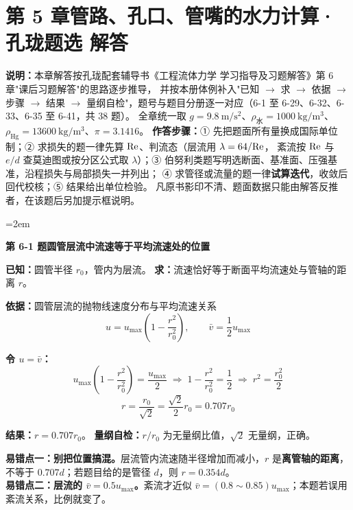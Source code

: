 \chapter*{第 5 章\quad 管路、孔口、管嘴的水力计算·孔珑题选 解答}

\begin{tishi}
\textbf{说明：}本章解答按孔珑配套辅导书《工程流体力学 学习指导及习题解答》第 6 章"课后习题解答"的思路逐步推导，
并按本册体例补入"已知 $\to$ 求 $\to$ 依据 $\to$ 步骤 $\to$ 结果 $\to$ 量纲自检"，题号与题目分册逐一对应（6-1 至 6-29、6-32、6-33、6-35 至 6-41，共 38 题）。
全章统一取 $g=9.8\ \mathrm{m/s^2}$、$\rho_{\text{水}}=1000\ \mathrm{kg/m^3}$、$\rho_{\text{Hg}}=13600\ \mathrm{kg/m^3}$、$\pi=3.1416$。
\textbf{作答步骤：}① 先把题面所有量换成国际单位制；② 求损失的题一律先算 $\mathrm{Re}$、判流态（层流用 $\lambda=64/\mathrm{Re}$，
紊流按 $\mathrm{Re}$ 与 $e/d$ 查莫迪图或按分区公式取 $\lambda$）；③ 伯努利类题写明选断面、基准面、压强基准，沿程损失与局部损失一并列出；
④ 求管径或流量的题一律\textbf{试算迭代}，收敛后回代校核；⑤ 结果给出单位检验。
凡原书影印不清、题面数据只能由解答反推者，在该题后另加提示框说明。
\end{tishi}

\sloppy
\emergencystretch=2em

\noindent\textbf{第 6-1 题\quad 圆管层流中流速等于平均流速处的位置}

\begin{jie}
\textbf{已知：}圆管半径 $r_0$，管内为层流。
\textbf{求：}流速恰好等于断面平均流速处与管轴的距离 $r$。

\textbf{依据：}圆管层流的抛物线速度分布与平均流速关系
\[ u=u_{\max}\left(1-\frac{r^2}{r_0^2}\right),\qquad \bar v=\frac{1}{2}u_{\max} \]

\textbf{令 $u=\bar v$：}
\[ u_{\max}\left(1-\frac{r^2}{r_0^2}\right)=\frac{u_{\max}}{2}\;\Longrightarrow\;1-\frac{r^2}{r_0^2}=\frac12
\;\Longrightarrow\;r^2=\frac{r_0^2}{2} \]
\[ r=\frac{r_0}{\sqrt2}=\frac{\sqrt2}{2}r_0=0.707r_0 \]

\textbf{结果：}$r=0.707r_0$。
\textbf{量纲自检：}$r/r_0$ 为无量纲比值，$\sqrt2$ 无量纲，正确。
\end{jie}

\begin{yicuo}
\textbf{易错点一：别把位置搞混。}层流管内流速随半径增加而减小，$r$ 是\textbf{离管轴的距离}，
不等于 $0.707d$；若题目给的是管径 $d$，则 $r=0.354d$。\\
\textbf{易错点二：层流的 $\bar v=0.5u_{\max}$。}紊流才近似 $\bar v=(0.8\sim0.85)u_{\max}$；本题若误用紊流关系，比例就变了。
\end{yicuo}

